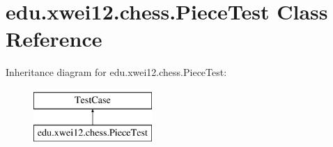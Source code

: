\hypertarget{classedu_1_1xwei12_1_1chess_1_1_piece_test}{}\section{edu.\+xwei12.\+chess.\+Piece\+Test Class Reference}
\label{classedu_1_1xwei12_1_1chess_1_1_piece_test}
Inheritance diagram for edu.\+xwei12.\+chess.\+Piece\+Test\+:\begin{figure}[H]
\begin{center}
\leavevmode
\includegraphics[height=2.000000cm]{classedu_1_1xwei12_1_1chess_1_1_piece_test}
\end{center}
\end{figure}
